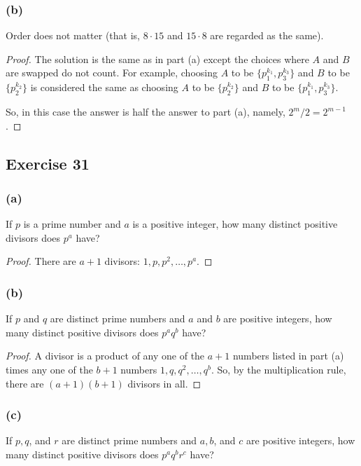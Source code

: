 \documentclass[14pt]{extarticle}
\begin{document}
\subsubsection{(b)}
Order does not matter (that is, \(8 \cdot 15\) and \(15 \cdot 8\) are regarded as the same).

\begin{proof}
     The solution is the same as in part (a) except the choices where $A$ and $B$ are swapped do not count. For example,
     choosing $A$ to be \(\{p_1^{k_1}, p_3^{k_3}\}\) and $B$ to be \(\{p_2^{k_2}\}\) is considered the same as choosing $A$
     to be \(\{p_2^{k_2}\}\) and $B$ to be \(\{p_1^{k_1}, p_3^{k_3}\}\).

     So, in this case the answer is half the answer to part (a), namely, \(2^m / 2 = 2^{m-1}\).
\end{proof}

\subsection{Exercise 31}
\subsubsection{(a)}
If $p$ is a prime number and $a$ is a positive integer, how many distinct positive divisors does $p^a$ have?

\begin{proof}
     There are \(a + 1\) divisors: \(1, p, p^2, \ldots, p^a\).
\end{proof}

\subsubsection{(b)}
If $p$ and $q$ are distinct prime numbers and $a$ and $b$ are positive integers, how many distinct positive divisors
does $p^a q^b$ have?

\begin{proof}
     A divisor is a product of any one of the \(a + 1\) numbers listed in part (a) times any one of the \(b + 1\) numbers
     \(1, q, q^2, \ldots, q^b\). So, by the multiplication rule, there are \((a + 1)(b + 1)\) divisors in all.
\end{proof}

\subsubsection{(c)}
If $p, q$, and $r$ are distinct prime numbers and $a, b$, and $c$ are positive integers, how many distinct positive
divisors does $p^a q^b r^c$ have?
\end{document}
